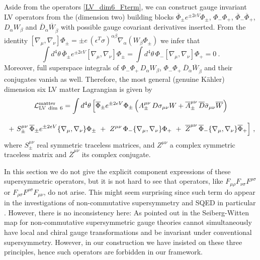 \documentclass[12pt]{revtex4}
\begin{document}
Aside from the operators \eqref{LV_dim6_Fterm}, we can 
construct gauge invariant LV operators from the (dimension two)
building blocks  
$\overline{\Phi}_\pm e^{\pm 2e V} \Phi_\pm$, $\Phi_- \Phi_+$, 
$\overline{\Phi}_- \overline{\Phi}_+$, $D_\alpha W_\beta$ and
$\overline{D}_{\dot\alpha} \overline{W}_{\dot\beta}$ with possible
gauge covariant derivatives inserted. From the identity 
\(
[ \nabla_\mu, \nabla_\nu] \Phi_\pm = \pm e \, 
(\epsilon^T \sigma)^{\alpha\beta} \nabla_\alpha( W_\beta \Phi_\pm)
\)
we infer that 
\begin{equation}
\int d^4\theta\, \overline{\Phi}_\pm e^{\pm 2eV} 
[ \nabla_\mu, \nabla_\nu] \Phi_\pm  
= \int d^4\theta\, \Phi_- [ \nabla_\mu, \nabla_\nu] \Phi_+ = 0~. 
\end{equation} 
Moreover, full superspace integrals of 
$\Phi_- \Phi_+\, D_\alpha W_\beta$, 
$\Phi_- \Phi_+\, \overline{D}_{\dot\alpha} \overline{W}_{\dot\beta}$ 
and their conjugates vanish as well. Therefore, the most general
(genuine K\"ahler) dimension six LV matter Lagrangian is given by 
\begin{gather}
{\cal L}_{\rm LV\ dim\ 6}^{\rm matter}  = 
\int d^4 \theta\, \Big[ 
\overline{\Phi}_\pm e^{\pm 2eV} \Phi_\pm \, 
\Big( 
A_\pm^{\mu\nu} \, D \sigma_{\mu\nu} W + 
\overline{A}_\pm^{\mu\nu} \, \overline{D} \bar\sigma_{\mu\nu} \overline{W}
\Big) 
\nonumber \\[2ex]
~+~ S_\pm^{\mu\nu}\,  \overline{\Phi}_\pm e^{\pm 2eV} 
\lbrace \nabla_\mu, \nabla_\nu \rbrace \Phi_\pm  
~+~ Z^{\mu\nu}\,  \Phi_- \lbrace \nabla_\mu, \nabla_\nu \rbrace \Phi_+ 
~+~ \overline{Z}^{\mu\nu}\,  
\overline{\Phi}_- \lbrace \nabla_\mu, \nabla_\nu \rbrace \overline{\Phi}_+ 
 \Big]~, 
\end{gather}
where $S_\pm^{\mu\nu}$ real symmetric traceless matrices, and 
$Z^{\mu\nu}$ a complex symmetric traceless matrix and
$\overline{Z}^{\mu\nu}$ its complex conjugate. 




In this section we do not give the explicit component expressions of
these supersymmetric operators, but it is not hard to see that
operators, like 
 $ F_{\mu\rho}F_{\nu\sigma}F^{\rho\sigma} $
or
  $ F_{\rho\sigma}F^{\rho\sigma}F_{\mu\nu} $, 
do not arise. This might seem surprising since such term do appear in
the investigations of non-commutative  supersymmetry and SQED in
particular \cite{Putz:2002ib,Mikulovic:2003sq}. However, there is no
inconsistency here: As pointed out in \cite{Mikulovic:2003sq} the
Seiberg-Witten map for non-commutative supersymmetric gauge 
theories cannot simultaneously have local and chiral gauge
transformations and be invariant under conventional supersymmetry. 
However, in our construction we have insisted on these three
principles, hence such operators are forbidden in our framework. 
\end{document}
